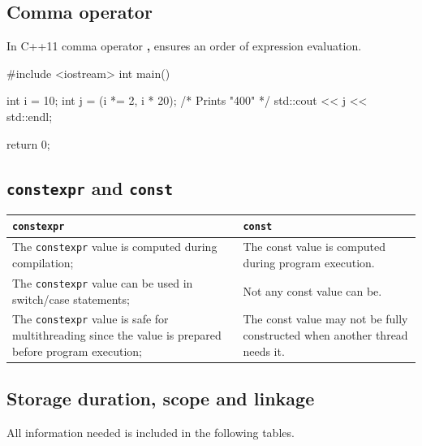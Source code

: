\documentclass[../main]{subfiles}
\begin{document}
\subsection{Comma operator}
    In C++11 comma operator \textbf{,} ensures an order of expression evaluation.
\begin{Code}
    #include <iostream>
    int main()
    {
        int i = 10;
        int j = (i *= 2, i * 20);
        /* Prints "400" */
        std::cout << j << std::endl;

        return 0;
    }
\end{Code}

\subsection{\texttt{constexpr} and \texttt{const}}
\begin{center}
    \begin{tabularx}{\textwidth}{|>{\centering\arraybackslash}X|>{\centering\arraybackslash}X|}
        \hline
        \textbf{\texttt{constexpr}} & \textbf{\texttt{const}} \\
        \hline
        The \texttt{constexpr} value is computed during compilation; & The const value is computed during program execution. \\
        \hline
        The \texttt{constexpr} value can be used in switch/case statements; & Not any const value can be. \\
        \hline
        The \texttt{constexpr} value is safe for multithreading since the value is prepared before program execution; & The const value may not be fully constructed when another thread needs it. \\
        \hline
    \end{tabularx}
\end{center}

\subsection{Storage duration, scope and linkage}
    All information needed is included in the following tables.
    
\end{document}
